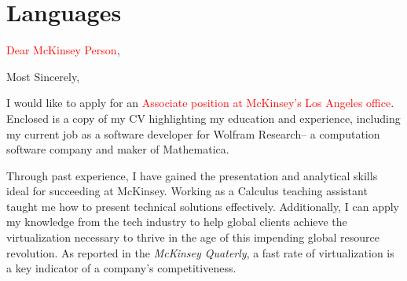 \documentclass[11pt,a4paper,unicode]{moderncv}
\begin{document}

\section{Languages}





\iffalse
\clearpage

\date{\today} %
\opening{\textcolor{red}{Dear McKinsey Person},} %
\closing{Most Sincerely,} %

\makelettertitle %
	I would like to apply for an \textcolor{red}{Associate position at McKinsey's Los Angeles office}. Enclosed is a copy of my CV highlighting my education and experience, including my current job as a software developer for Wolfram Research-- a computation software company and maker of Mathematica. 
		
\vspace{3mm}  
Through past experience, I have gained the presentation and analytical skills ideal for succeeding at McKinsey. Working as a Calculus teaching assistant taught me how to present technical solutions effectively. Additionally, I can apply my knowledge from the tech industry to help global clients achieve the virtualization necessary to thrive in the age of this impending global resource revolution. As reported in the \emph{McKinsey Quaterly}, a fast rate of virtualization is a key indicator of a company's competitiveness. 
\end{document}
